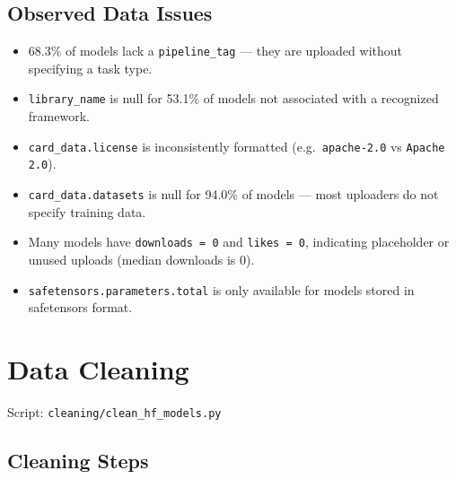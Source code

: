\documentclass[11pt]{article}
\begin{document}
\subsection{Observed Data Issues}

\begin{itemize}
  \item 68.3\% of models lack a \texttt{pipeline\_tag} --- they are uploaded without specifying a task type.
  \item \texttt{library\_name} is null for 53.1\% of models not associated with a recognized framework.
  \item \texttt{card\_data.license} is inconsistently formatted (e.g.\ \texttt{apache-2.0} vs \texttt{Apache 2.0}).
  \item \texttt{card\_data.datasets} is null for 94.0\% of models --- most uploaders do not specify training data.
  \item Many models have \texttt{downloads = 0} and \texttt{likes = 0}, indicating placeholder or unused uploads (median downloads is 0).
  \item \texttt{safetensors.parameters.total} is only available for models stored in safetensors format.
\end{itemize}

\section{Data Cleaning}

Script: \texttt{cleaning/clean\_hf\_models.py}

\subsection{Cleaning Steps}
\end{document}
